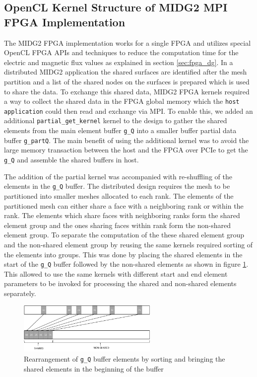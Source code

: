 \subsection{OpenCL Kernel Structure of MIDG2 MPI FPGA Implementation}
\label{sec:midge_mpi_struc}

The MIDG2 FPGA implementation works for a single FPGA and utilizes special OpenCL FPGA
APIs and techniques to reduce the computation time for the electric and magnetic flux values
as explained in section \ref{sec:fpga_dg}. In a distributed MIDG2 application the shared
surfaces are identified after the mesh partition and a list of the shared nodes on the
surfaces is prepared which is used to share the data.
To exchange this shared data, MIDG2 FPGA kernels required a way to collect the shared
data in the FPGA global memory which the \texttt{host application} could then read and
exchange via MPI. To enable this, we added an additional \texttt{partial\_get\_kernel}
kernel to the design to gather the shared elements from
the main element buffer \texttt{g\_Q} into a smaller buffer partial data buffer \texttt{g\_partQ}.
The main benefit of using the additional kernel was to avoid the large memory transaction between the
host and the FPGA over PCIe to get the \texttt{g\_Q} and assemble the shared buffers in host.

The addition of the partial kernel was accompanied with re-shuffling of the elements in the \texttt{g\_Q}
buffer. The distributed design requires the mesh to be partitioned into smaller meshes allocated
to each rank. The elements of the partitioned mesh can either share a face with a neighboring
rank or within the rank. The elements which share faces with neighboring ranks form the shared
element group and the ones sharing faces within rank form the non-shared element group.
To separate the computation of the these shared element group and the non-shared element group
by reusing the same kernels required sorting of the elements into groups. This was done by
placing the shared elements in the start of the \texttt{g\_Q} buffer followed by the non-shared
elements as shown in figure \ref{fig:rearrange}. This allowed to use the same kernels with different
start and end element parameters to be invoked for processing the shared and non-shared elements separately.
\begin{figure}%
    \centering
    \includegraphics[width=0.6\textwidth]{images/rearrange}
    \caption{Rearrangement of \texttt{g\_Q} buffer elements by sorting and bringing the
    shared elements in the beginning of the buffer}
    \label{fig:rearrange}
\end{figure}

